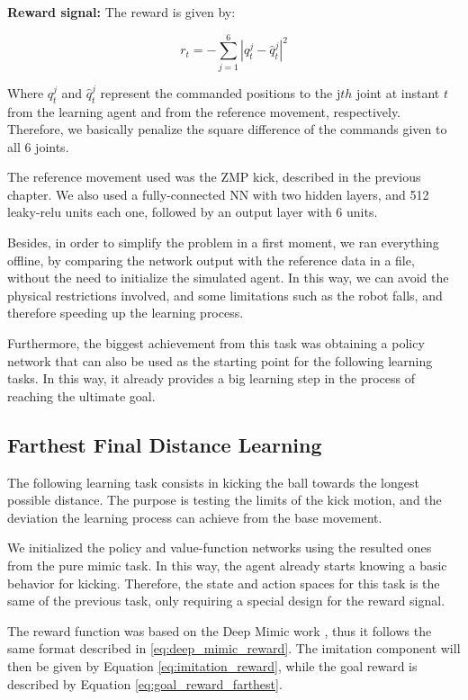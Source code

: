 \textbf{Reward signal:} The reward is given by:

\begin{equation}
r_t = -\sum_{j=1}^{6}{|q_t^j-\hat{q}_t^j|^2}
\end{equation}

Where $q_t^j$ and $\hat{q}_t^j$ represent the commanded positions to the j$th$ joint at instant $t$ from the learning agent and from the reference movement, respectively. Therefore, we basically penalize the square difference of the commands given to all 6 joints.

The reference movement used was the ZMP kick, described in the previous chapter. We also used a fully-connected NN with two hidden layers, and 512 leaky-relu units each one, followed by an output layer with 6 units.

Besides, in order to simplify the problem in a first moment, we ran everything offline, by comparing the network output with the reference data in a file, without the need to initialize the simulated agent. In this way, we can avoid the physical restrictions involved, and some limitations such as the robot falls, and therefore speeding up the learning process.

Furthermore, the biggest achievement from this task was obtaining a policy network that can also be used as the starting point for the following learning tasks. In this way, it already provides a big learning step in the process of reaching the ultimate goal.

\subsection{Farthest Final Distance Learning}
\label{sec:far_kick_description}

The following learning task consists in kicking the ball towards the longest possible distance. The purpose is testing the limits of the kick motion, and the deviation the learning process can achieve from the base movement.

We initialized the policy and value-function networks using the resulted ones from the pure mimic task. In this way, the agent already starts knowing a basic behavior for kicking. Therefore, the state and action spaces for this task is the same of the previous task, only requiring a special design for the reward signal.

The reward function was based on the Deep Mimic work \cite{deepmimic}, thus it follows the same format described in \eqref{eq:deep_mimic_reward}. The imitation component will then be given by Equation \eqref{eq:imitation_reward}, while the goal reward is described by Equation \eqref{eq:goal_reward_farthest}.

